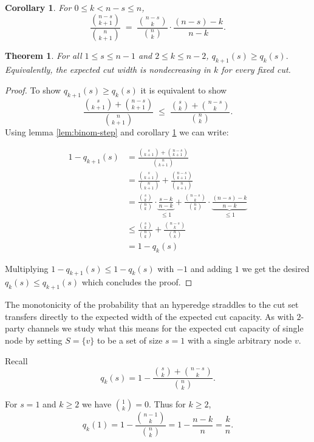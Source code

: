 \documentclass[10pt,twocolumn]{article}
\newtheorem{theorem}{Theorem}[section]
\newtheorem{corollary}{Corollary}[theorem]
\begin{document}
\begin{corollary}\label{cor:binom-step-mirror}
For $0\le k < n-s \le n$,
\[
\frac{\binom{n-s}{k+1}}{\binom{n}{k+1}}
\;=\;
\frac{\binom{n-s}{k}}{\binom{n}{k}}\cdot \frac{(n-s)-k}{\,n-k\,}.
\]
\end{corollary}


\begin{theorem}
\label{thm:qk-monotone}
For all $1\le s\le n-1$ and $2\le k\le n-2$,
\(
q_{k+1}(s)\ge q_k(s).
\)
Equivalently, the expected cut width is nondecreasing in $k$ for \emph{every} fixed cut.
\end{theorem}

\begin{proof}
To show $q_{k+1}(s)\ge q_k(s)$ it is equivalent to show
\[
\frac{\binom{s}{k+1}+\binom{n-s}{k+1}}{\binom{n}{k+1}}
\;\le\;
\frac{\binom{s}{k}+\binom{n-s}{k}}{\binom{n}{k}}.
\]
Using lemma \ref{lem:binom-step} and corollary \ref{cor:binom-step-mirror} we can write:

\begin{equation}
  \begin{aligned}
1-q_{k+1}(s) &= \frac{\binom{s}{k+1}+\binom{n-s}{k+1}}{\binom{n}{k+1}}\\
&= \frac{\binom{s}{k+1}}{\binom{n}{k+1}} +\frac{\binom{n-s}{k+1}}{\binom{n}{k+1}}\\
&= \frac{\binom{s}{k}}{\binom{n}{k}}\cdot\underbrace{\frac{s-k}{n-k}}_{\leq 1} +\frac{\binom{n-s}{k}}{\binom{n}{k}}\cdot\underbrace{\frac{(n-s)-k}{n-k}}_{\leq 1}\\
&\leq \frac{\binom{s}{k}}{\binom{n}{k}} +\frac{\binom{n-s}{k}}{\binom{n}{k}}\\
& = 1- q_{k}(s)
  \end{aligned}
  \end{equation}

Multiplying $1-q_{k+1}(s) \leq 1-q_{k}(s)$ with $-1$ and adding $1$ we get the desired $q_k(s) \leq q_{k+1}(s)$ which concludes the proof.
\end{proof}

The monotonicity of the probability that an hyperedge straddles to the cut set transfers directly to the expected width of the expected cut capacity.
As with $2$-party channels we study what this means for the expected cut capacity of single node by setting $S = \{v\}$ to be a set of size $s=1$ with a single arbitrary node $v$. 

Recall
\[
q_k(s)=1-\frac{\binom{s}{k}+\binom{n-s}{k}}{\binom{n}{k}}.
\]

For $s=1$ and $k\ge 2$ we have
 $\binom{1}{k}=0$. Thus for $k\ge 2$,
  \[
  q_k(1)=1-\frac{\binom{n-1}{k}}{\binom{n}{k}}
  =1-\frac{n-k}{n}
  =\boxed{\frac{k}{n}}.
  \]
\end{document}
